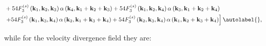 \begin{align*}
    & +54 F_{3}^{(s)}\left(\mathbf{k}_{1}, \mathbf{k}_{2}, \mathbf{k}_{3}\right) \alpha\left(\mathbf{k}_{4}, \mathbf{k}_{1}+\mathbf{k}_{2}+\mathbf{k}_{3}\right)+54 F_{3}^{(s)}\left(\mathbf{k}_{1}, \mathbf{k}_{2}, \mathbf{k}_{4}\right) \alpha\left(\mathbf{k}_{3}, \mathbf{k}_{1}+\mathbf{k}_{2}+\mathbf{k}_{4}\right) \\
    & \left.+54 F_{3}^{(s)}\left(\mathbf{k}_{1}, \mathbf{k}_{3}, \mathbf{k}_{4}\right) \alpha\left(\mathbf{k}_{2}, \mathbf{k}_{1}+\mathbf{k}_{3}+\mathbf{k}_{4}\right)+54 F_{3}^{(s)}\left(\mathbf{k}_{2}, \mathbf{k}_{3}, \mathbf{k}_{4}\right) \alpha\left(\mathbf{k}_{1}, \mathbf{k}_{2}+\mathbf{k}_{3}+\mathbf{k}_{4}\right)\right] \autolabel{},
\end{align*} 

\newpage


while for the velocity divergence field they are:


